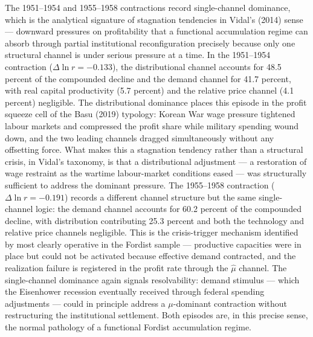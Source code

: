 The 1951--1954 and 1955--1958 contractions record single-channel
dominance, which is the analytical signature of stagnation tendencies
in Vidal's (2014) sense --- downward pressures on profitability that a
functional accumulation regime can absorb through partial institutional
reconfiguration precisely because only one structural channel is under
serious pressure at a time. In the 1951--1954 contraction ($\Delta\ln r
= -0.133$), the distributional channel accounts for 48.5 percent of the
compounded decline and the demand channel for 41.7 percent, with real
capital productivity (5.7 percent) and the relative price channel (4.1
percent) negligible. The distributional dominance places this episode in
the profit squeeze cell of the Basu (2019) typology: Korean War wage
pressure tightened labour markets and compressed the profit share while
military spending wound down, and the two leading channels dragged
simultaneously without any offsetting force. What makes this a stagnation
tendency rather than a structural crisis, in Vidal's taxonomy, is that
a distributional adjustment --- a restoration of wage restraint as the
wartime labour-market conditions eased --- was structurally sufficient
to address the dominant pressure. The 1955--1958 contraction ($\Delta\ln r
= -0.191$) records a different channel structure but the same
single-channel logic: the demand channel accounts for 60.2 percent of
the compounded decline, with distribution contributing 25.3 percent and
both the technology and relative price channels negligible. This is the
crisis-trigger mechanism identified by \citet{OkishioEtAl2022} most
clearly operative in the Fordist sample --- productive capacities were
in place but could not be activated because effective demand contracted,
and the realization failure is registered in the profit rate through the
$\hat{\mu}$ channel. The single-channel dominance again signals
resolvability: demand stimulus --- which the Eisenhower recession
eventually received through federal spending adjustments --- could in
principle address a $\mu$-dominant contraction without restructuring the
institutional settlement. Both episodes are, in this precise sense,
the normal pathology of a functional Fordist accumulation regime.


